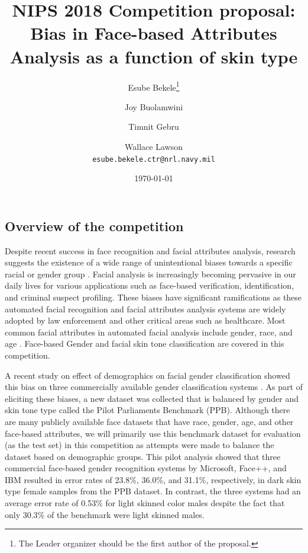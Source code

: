 \documentclass[11pt, oneside]{article}
\title{NIPS 2018 Competition proposal: Bias in Face-based Attributes Analysis
 as a function of skin type}
\author{Esube Bekele\thanks{The Leader organizer should be the first author of
		 the proposal.} \and Joy Buolamwini \and Timnit Gebru \and Wallace
	 Lawson
    \\
{\tt esube.bekele.ctr@nrl.navy.mil}\\
}
\date{\today}
\makeatletter
\let\@internalcite\cite
\def\cite{\def\citeauthoryear##1##2{##1, ##2}\@internalcite}
\makeatother
\begin{document}
\maketitle

\subsection{Overview of the competition}

Despite recent success in face recognition and facial attributes analysis,
research suggests the existence of a wide range of unintentional biases towards
a specific racial or gender group \cite{phillips2011other} \cite{klare2012face}.
Facial analysis is increasingly becoming pervasive in our daily lives for
various applications such as face-based verification, identification, and
criminal suspect profiling.  These biases have significant ramifications as
these automated facial recognition and facial attributes analysis systems are
widely adopted by law enforcement and other critical areas such as healthcare.
Most common facial attributes in automated facial analysis include gender,
race, and age \cite{fu2014learning} \cite{ng2015review}
\cite{han2015demographic}. Face-based Gender and facial skin tone
classification are covered in this competition.

A recent study on effect of demographics on facial gender classification
showed this bias on three commercially available gender classification systems
\cite{buolamwini2018gender}. As part of eliciting these biases, a new dataset
was collected that is balanced by gender and skin tone type called the Pilot
Parliaments Benchmark (PPB). Although there are many publicly available face
datasets that have race, gender, age, and other face-based attributes, we will
primarily use this benchmark dataset for evaluation (as the test set) in this
competition as attempts were made to balance the dataset based on demographic
groups. This pilot analysis showed that three commercial face-based gender
recognition systems by Microsoft, Face++, and IBM resulted in error rates of
23.8\%, 36.0\%, and 31.1\%, respectively, in dark skin type female samples from
the PPB dataset. In contrast, the three systems had an average error rate of
0.53\% for light skinned color males despite the fact that only 30.3\% of the
benchmark were light skinned males\cite{buolamwini2018gender}.
\end{document}
